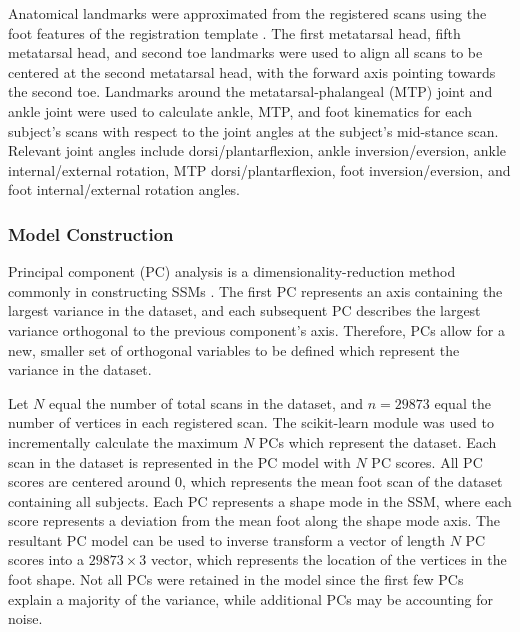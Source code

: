 \documentclass[defaultstyle,11pt]{thesis}
\begin{document}
Anatomical landmarks were approximated from the registered scans using the foot features of the registration template \citep{VandenHerrewegen2014b}.
The first metatarsal head, fifth metatarsal head, and second toe landmarks were used to align all scans to be centered at the second metatarsal head, with the forward axis pointing towards the second toe.
Landmarks around the metatarsal-phalangeal (MTP) joint and ankle joint were used to calculate ankle, MTP, and foot kinematics for each subject's scans with respect to the joint angles at the subject's mid-stance scan.
Relevant joint angles include dorsi/plantarflexion, ankle inversion/eversion, ankle internal/external rotation, MTP dorsi/plantarflexion, foot inversion/eversion, and foot internal/external rotation angles.

\hypertarget{model-construction}{%
\subsubsection{Model Construction}\label{model-construction}}

Principal component (PC) analysis is a dimensionality-reduction method commonly in constructing SSMs \citep{Reed2008, Park2015a, Conrad2019, Stankovic2020}.
The first PC represents an axis containing the largest variance in the dataset, and each subsequent PC describes the largest variance orthogonal to the previous component's axis.
Therefore, PCs allow for a new, smaller set of orthogonal variables to be defined which represent the variance in the dataset.

Let \(N\) equal the number of total scans in the dataset, and \(n=29873\) equal the number of vertices in each registered scan. The scikit-learn module \citep{JMLR:v12:pedregosa11a} was used to incrementally calculate the maximum \(N\) PCs which represent the dataset.
Each scan in the dataset is represented in the PC model with \(N\) PC scores.
All PC scores are centered around 0, which represents the mean foot scan of the dataset containing all subjects.
Each PC represents a shape mode in the SSM, where each score represents a deviation from the mean foot along the shape mode axis. The resultant PC model can be used to inverse transform a vector of length \(N\) PC scores into a \(29873\times 3\) vector, which represents the location of the vertices in the foot shape. Not all PCs were retained in the model since the first few PCs explain a majority of the variance, while additional PCs may be accounting for noise.
\end{document}
